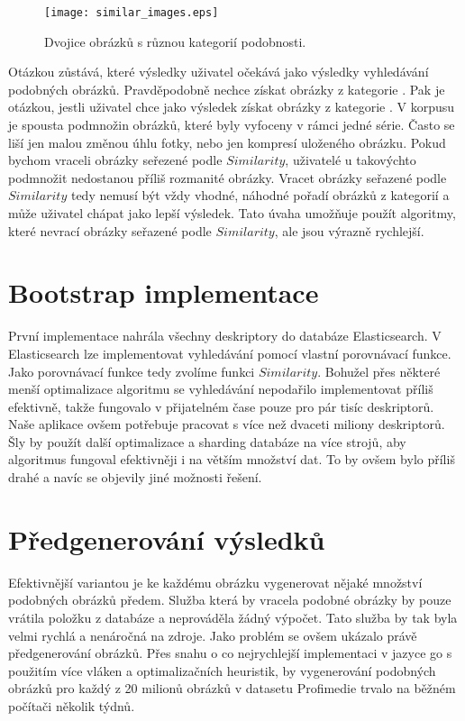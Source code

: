 \begin{figure}[h]
  \centering
  \texttt{[image: similar\_images.eps]}
  \caption{Dvojice obrázků s různou kategorií podobnosti.}
  \label{fig:simexamples}
\end{figure}

Otázkou zůstává, které výsledky uživatel očekává jako výsledky vyhledávání podobných obrázků. Pravděpodobně nechce získat obrázky z kategorie . Pak je otázkou, jestli uživatel chce jako výsledek získat obrázky z kategorie . V korpusu je spousta podmnožin obrázků, které byly vyfoceny v rámci jedné série. Často se liší jen malou změnou úhlu fotky, nebo jen kompresí uloženého obrázku. Pokud bychom vraceli obrázky seřezené podle $Similarity$, uživatelé u takovýchto podmnožit nedostanou příliš rozmanité obrázky. Vracet obrázky seřazené podle $Similarity$ tedy nemusí být vždy vhodné, náhodné pořadí obrázků z kategorií  a  může uživatel chápat jako lepší výsledek. Tato úvaha umožňuje použít algoritmy, které nevrací obrázky seřazené podle $Similarity$, ale jsou výrazně rychlejší.


\section{Bootstrap implementace}

První implementace nahrála všechny deskriptory do databáze Elasticsearch. V Elasticsearch lze implementovat vyhledávání pomocí vlastní porovnávací funkce. Jako porovnávací funkce tedy zvolíme funkci $Similarity$. Bohužel přes některé menší optimalizace algoritmu se vyhledávání nepodařilo implementovat příliš efektivně, takže fungovalo v přijatelném čase pouze pro pár tisíc deskriptorů. Naše aplikace ovšem potřebuje pracovat s více než dvaceti miliony deskriptorů. Šly by použít další optimalizace a sharding databáze na více strojů, aby algoritmus fungoval efektivněji i na větším množství dat. To by ovšem bylo příliš drahé a navíc se objevily jiné možnosti řešení.


\section{Předgenerování výsledků}

Efektivnější variantou je ke každému obrázku vygenerovat nějaké množství podobných obrázků předem. Služba která by vracela podobné obrázky by pouze vrátila položku z databáze a neprováděla žádný výpočet. Tato služba by tak byla velmi rychlá a nenáročná na zdroje. Jako problém se ovšem ukázalo právě předgenerování obrázků. Přes snahu o co nejrychlejší implementaci v jazyce go s použitím více vláken a optimalizačních heuristik, by vygenerování podobných obrázků pro každý z 20 milionů obrázků v datasetu Profimedie trvalo na běžném počítači několik týdnů.

